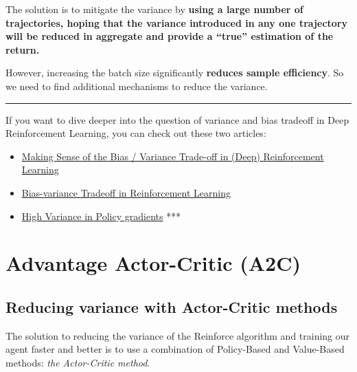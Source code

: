 \documentclass[11pt,a4paper]{article}
\begin{document}

The solution is to mitigate the variance by \textbf{using a large number of trajectories, hoping that the variance introduced in any one trajectory will be reduced in aggregate and provide a ``true'' estimation of the return.}

However, increasing the batch size significantly \textbf{reduces sample efficiency}. So we need to find additional mechanisms to reduce the variance.

\begin{center}\rule{0.5\linewidth}{0.5pt}\end{center}

If you want to dive deeper into the question of variance and bias tradeoff in Deep Reinforcement Learning, you can check out these two articles:

\begin{itemize}
\tightlist
\item
  \href{https://blog.mlreview.com/making-sense-of-the-bias-variance-trade-off-in-deep-reinforcement-learning-79cf1e83d565}{Making Sense of the Bias / Variance Trade-off in (Deep) Reinforcement Learning}
\item
  \href{https://www.endtoend.ai/blog/bias-variance-tradeoff-in-reinforcement-learning/}{Bias-variance Tradeoff in Reinforcement Learning}
\item
  \href{https://balajiai.github.io/high_variance_in_policy_gradients}{High Variance in Policy gradients} ***
\end{itemize}

\section{Advantage Actor-Critic (A2C)}\label{advantage-actor-critic-a2c}

\subsection{Reducing variance with Actor-Critic methods}\label{reducing-variance-with-actor-critic-methods}

The solution to reducing the variance of the Reinforce algorithm and training our agent faster and better is to use a combination of Policy-Based and Value-Based methods: \emph{the Actor-Critic method}.
\end{document}
